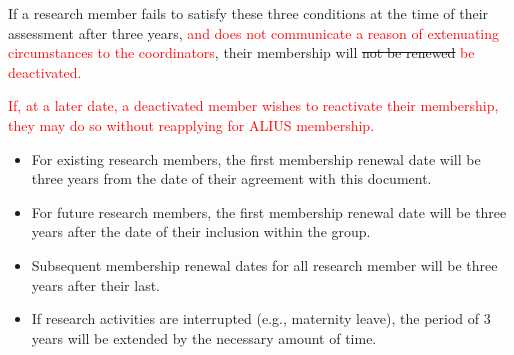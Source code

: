 \documentclass[a4paper, 11pt]{scrartcl}
\begin{document}
If a research member fails to satisfy these three conditions at the time of their assessment after three years, \textcolor{red}{and does not communicate a reason of extenuating circumstances to the coordinators}, their membership will \sout{not be renewed} \textcolor{red}{be deactivated.}

\textcolor{red}{If, at a later date, a deactivated member wishes to reactivate their membership, they may do so without reapplying for ALIUS membership.}

\begin{itemize}

\item For existing research members, the first membership renewal date will be three years from the date of their agreement with this document. 
\item For future research members, the first membership renewal date will be three years after the date of their inclusion within the group. 
\item Subsequent membership renewal dates for all research member will be three years after their last.
\item If research activities are interrupted (e.g., maternity leave), the period of 3 years will be extended by the necessary amount of time.
\end{itemize}
\end{document}
